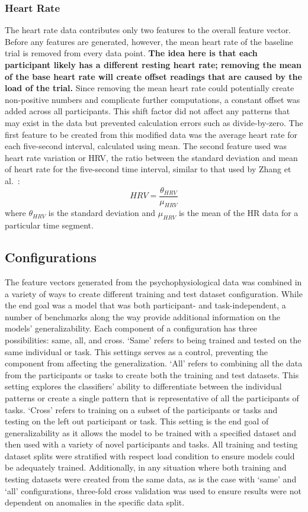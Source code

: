\documentclass[11pt]{article}
\begin{document}
		\subsubsection{Heart Rate}
		The heart rate data contributes only two features to the overall feature vector. Before any features are generated, however, the mean heart rate of the baseline trial is removed from every data point. {\bf The idea here is that each participant likely has a different resting heart rate; removing the mean of the base heart rate will create offset readings that are caused by the load of the trial.} Since removing the mean heart rate could potentially create non-positive numbers and complicate further computations, a constant offset was added across all participants. This shift factor did not affect any patterns that may exist in the data but prevented calculation errors such as divide-by-zero. The first feature to be created from this modified data was the average heart rate for each five-second interval, calculated using mean. The second feature used was heart rate variation or HRV, the ratio between the standard deviation and mean of heart rate for the five-second time interval, similar to that used by Zhang et al.~\cite{}: \[HRV = \frac{\theta_{HRV}}{\mu_{HRV}}\] where \( \theta_{HRV} \) is the standard deviation and \( \mu_{HRV}\) is the mean of the HR data for a particular time segment.
				
		
	\subsection{Configurations}
	The feature vectors generated from the psychophysiological data was combined in a variety of ways to create different training and test dataset configuration. While the end goal was a model that was both participant- and task-independent, a number of benchmarks along the way provide additional information on the models' generalizability. Each component of a configuration has three possibilities: same, all, and cross. `Same' refers to being trained and tested on the same individual or task. This settings serves as a control, preventing the component from affecting the generalization. `All' refers to combining all the data from the participants or tasks to create both the training and test datasets. This setting explores the classifiers' ability to differentiate between the individual patterns or create a single pattern that is representative of all the participants of tasks. `Cross' refers to training on a subset of the participants or tasks and testing on the left out participant or task. This setting is the end goal of generalizability as it allows the model to be trained with a specified dataset and then used with a variety of novel participants and tasks. All training and testing dataset splits were stratified with respect load condition to ensure models could be adequately trained. Additionally, in any situation where both training and testing datasets were created from the same data, as is the case with `same' and `all' configurations, three-fold cross validation was used to ensure results were not dependent on anomalies in the specific data split.
	
\end{document}

